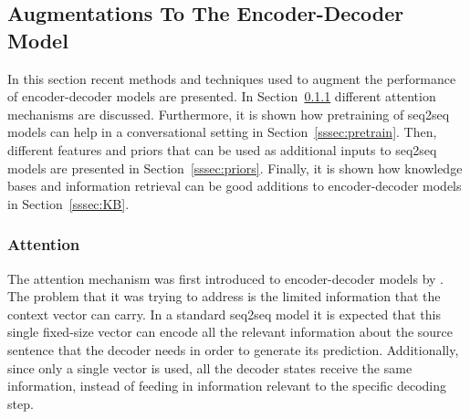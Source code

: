 \documentclass[12pt]{article}
\begin{document}
\subsection{Augmentations To The Encoder-Decoder Model} \label{ssec:32}
In this section recent methods and techniques used to augment the performance of encoder-decoder models are presented. In Section~\ref{sssec:attention} different attention mechanisms are discussed. Furthermore, it is shown how pretraining of seq2seq models can help in a conversational setting in Section~\ref{sssec:pretrain}. Then, different features and priors that can be used as additional inputs to seq2seq models are presented in Section~\ref{sssec:priors}. Finally, it is shown how knowledge bases and information retrieval can be good additions to encoder-decoder models in Section~\ref{sssec:KB}.

\subsubsection{Attention} \label{sssec:attention}
The attention mechanism was first introduced to encoder-decoder models by \cite{Bahdanau:2014}. The problem that it was trying to address is the limited information that the context vector can carry. In a standard seq2seq model it is expected that this single fixed-size vector can encode all the relevant information about the source sentence that the decoder needs in order to generate its prediction. Additionally, since only a single vector is used, all the decoder states receive the same information, instead of feeding in information relevant to the specific decoding step. 
\end{document}
